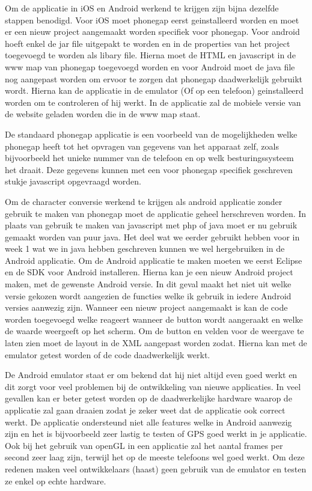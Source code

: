 Om de applicatie in iOS en Android werkend te krijgen zijn bijna dezelfde stappen benodigd. Voor iOS moet phonegap eerst geinstalleerd worden en moet er een nieuw project aangemaakt worden specifiek voor phonegap. Voor android hoeft enkel de jar file uitgepakt te worden en in de properties van het project toegevoegd te worden als libary file.
Hierna moet de HTML en javascript in de www map van phonegap toegevoegd worden en voor Android moet de java file nog aangepast worden om ervoor te zorgen dat phonegap daadwerkelijk gebruikt wordt. Hierna kan de applicatie in de emulator (Of op een telefoon) geinstalleerd worden om te controleren of hij werkt. In de applicatie zal de mobiele versie van de website geladen worden die in de www map staat.

De standaard phonegap applicatie is een voorbeeld van de mogelijkheden welke phonegap heeft tot het opvragen van gegevens van het apparaat zelf, zoals bijvoorbeeld het unieke nummer van de telefoon en op welk besturingssysteem het draait. Deze gegevens kunnen met een voor phonegap specifiek geschreven stukje javascript opgevraagd worden.

Om de character conversie werkend te krijgen als android applicatie zonder gebruik te maken van phonegap moet de applicatie geheel herschreven worden. In plaats van gebruik te maken van javascript met php of java moet er nu gebruik gemaakt worden van puur java. Het deel wat we eerder gebruikt hebben voor in week 1 wat we in java hebben geschreven kunnen we wel hergebruiken in de Android applicatie. Om de Android applicatie te maken moeten we eerst Eclipse en de SDK voor Android installeren. Hierna kan je een nieuw Android project maken, met de gewenste Android versie. In dit geval maakt het niet uit welke versie gekozen wordt aangezien de functies welke ik gebruik in iedere Android versies aanwezig zijn. Wanneer een nieuw project aangemaakt is kan de code worden toegevoegd welke reageert wanneer de button wordt aangeraakt en welke de waarde weergeeft op het scherm. Om de button en velden voor de weergave te laten zien moet de layout in de XML aangepast worden zodat. Hierna kan met de emulator getest worden of de code daadwerkelijk werkt.

De Android emulator staat er om bekend dat hij niet altijd even goed werkt en dit zorgt voor veel problemen bij de ontwikkeling van nieuwe applicaties. In veel gevallen kan er beter getest worden op de daadwerkelijke hardware waarop de applicatie zal gaan draaien zodat je zeker weet dat de applicatie ook correct werkt. De applicatie ondersteund niet alle features welke in Android aanwezig zijn en het is bijvoorbeeld zeer lastig te testen of GPS goed werkt in je applicatie. Ook bij het gebruik van openGL in een applicatie zal het aantal frames per second zeer laag zijn, terwijl het op de meeste telefoons wel goed werkt. Om deze redenen maken veel ontwikkelaars (haast) geen gebruik van de emulator en testen ze enkel op echte hardware.


